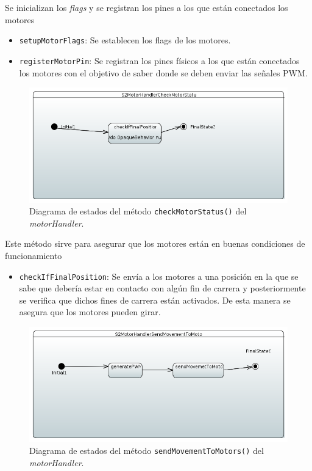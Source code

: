 Se inicializan los \textit{flags} y se registran los pines a los que están conectados los motores

\begin{itemize}
    \item \texttt{setupMotorFlags}: Se establecen los flags de los motores.
    \item \texttt{registerMotorPin}: Se registran los pines físicos a los que están conectados los motores con el objetivo de saber donde se deben enviar las señales PWM.
\end{itemize}

\begin{figure}[H]
    \centering
    \includegraphics[width=1\linewidth]{pictures/S2MotorHandlerCheckMotorStatus.PNG}
    \caption{Diagrama de estados del método \texttt{checkMotorStatus()} del \textit{motorHandler}.}
    \label{fig:fun_check_motor_status_motor_handler}
\end{figure}

Este método sirve para asegurar que los motores están en buenas condiciones de funcionamiento

\begin{itemize}
    \item \texttt{checkIfFinalPosition}: Se envía a los motores a una posición en la que se sabe que debería estar en contacto con algún fin de carrera y posteriormente se verifica que dichos fines de carrera están activados. De esta manera se asegura que los motores pueden girar.

\end{itemize}

\begin{figure}[H]
    \centering
    \includegraphics[width=1\linewidth]{pictures/S2MotorHandlerSendMovementToMotors.PNG}
    \caption{Diagrama de estados del método \texttt{sendMovementToMotors()} del \textit{motorHandler}.}
    \label{fig:fun_send_movement_to_motors_motor_handler}
\end{figure}

